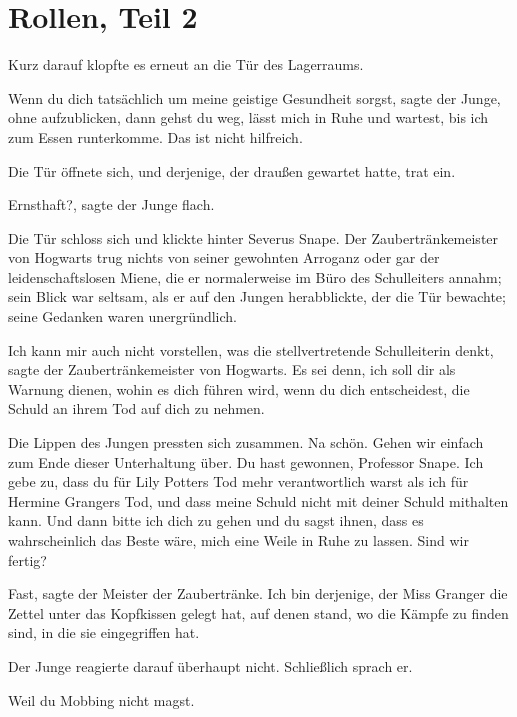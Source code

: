 \chapter{Rollen, Teil 2}

Kurz darauf klopfte es erneut an die Tür des Lagerraums.

\glqq Wenn du dich tatsächlich um meine geistige Gesundheit sorgst\grqq{}, sagte
der Junge, ohne aufzublicken, \glqq dann gehst du weg, lässt mich in Ruhe und
wartest, bis ich zum Essen runterkomme. Das ist nicht hilfreich.\grqq{}

Die Tür öffnete sich, und derjenige, der draußen gewartet hatte, trat ein.

\glqq Ernsthaft?\grqq{}, sagte der Junge flach.

Die Tür schloss sich und klickte hinter Severus Snape. Der Zaubertränkemeister
von Hogwarts trug nichts von seiner gewohnten Arroganz oder gar der
leidenschaftslosen Miene, die er normalerweise im Büro des Schulleiters annahm;
sein Blick war seltsam, als er auf den Jungen herabblickte, der die Tür
bewachte; seine Gedanken waren unergründlich.

\glqq Ich kann mir auch nicht vorstellen, was die stellvertretende Schulleiterin
denkt\grqq{}, sagte der Zaubertränkemeister von Hogwarts. \glqq Es sei denn, ich
soll dir als Warnung dienen, wohin es dich führen wird, wenn du dich
entscheidest, die Schuld an ihrem Tod auf dich zu nehmen.\grqq{}

Die Lippen des Jungen pressten sich zusammen. \glqq Na schön. Gehen wir einfach
zum Ende dieser Unterhaltung über. Du hast gewonnen, Professor Snape. Ich gebe
zu, dass du für Lily Potters Tod mehr verantwortlich warst als ich für Hermine
Grangers Tod, und dass meine Schuld nicht mit deiner Schuld mithalten kann. Und
dann bitte ich dich zu gehen und du sagst ihnen, dass es wahrscheinlich das
Beste wäre, mich eine Weile in Ruhe zu lassen. Sind wir fertig?\grqq{}

\glqq Fast\grqq{}, sagte der Meister der Zaubertränke. \glqq Ich bin derjenige,
der Miss Granger die Zettel unter das Kopfkissen gelegt hat, auf denen stand, wo
die Kämpfe zu finden sind, in die sie eingegriffen hat.\grqq{}

Der Junge reagierte darauf überhaupt nicht. Schließlich sprach er.

\glqq Weil du Mobbing nicht magst.\grqq{}

